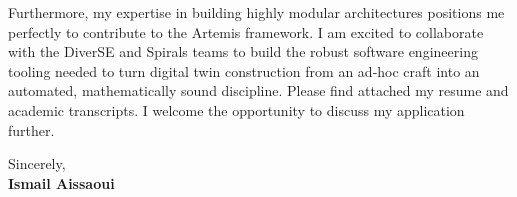 \documentclass[11pt,a4paper]{article}
\begin{document}
\vspace{0.5em}
\noindent
Furthermore, my expertise in building highly modular architectures positions me perfectly to contribute to the Artemis framework. I am excited to collaborate with the DiverSE and Spirals teams to build the robust software engineering tooling needed to turn digital twin construction from an ad-hoc craft into an automated, mathematically sound discipline. Please find attached my resume and academic transcripts. I welcome the opportunity to discuss my application further.

\vspace{1.5em}
\noindent
Sincerely, \\[0.5em]
\textbf{Ismail Aissaoui}
\end{document}
